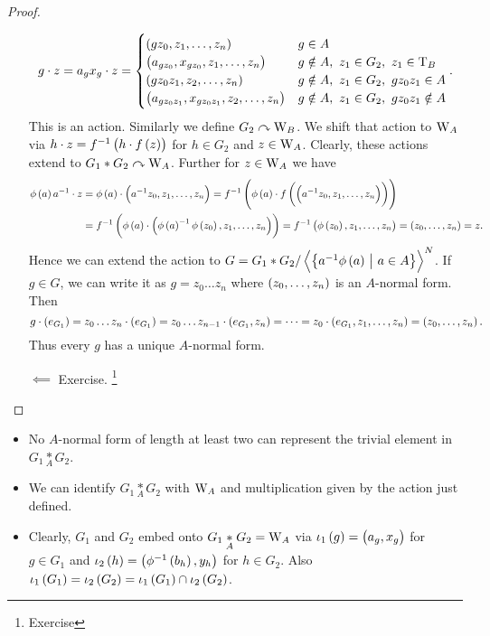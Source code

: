 \begin{proof}
\begin{itemize}
$$ g \cdot z = a_gx_g \cdot z =
\begin{cases}
\br{gz_0, z_1, \dots, z_n} & g \in A \\
\br{a_{gz_0}, x_{gz_0}, z_1, \dots, z_n} & g \notin A, \ z_1 \in G_2, \ z_1 \in \T_B \\
\br{gz_0z_1, z_2, \dots, z_n} & g \notin A, \ z_1 \in G_2, \ gz_0z_1 \in A \\
\br{a_{gz_0z_1}, x_{gz_0z_1}, z_2, \dots, z_n} & g \notin A, \ z_1 \in G_2, \ gz_0z_1 \notin A
\end{cases}.
$$
This is an action. Similarly we define $ G_2 \curvearrowright \mathrm{W}_B $. We shift that action to $ \mathrm{W}_A $ via $ h \cdot z = f^{-1}\br{h \cdot f\br{z}} $ for $ h \in G_2 $ and $ z \in \mathrm{W}_A $. Clearly, these actions extend to $ G_1 * G_2 \curvearrowright \mathrm{W}_A $. Further for $ z \in \mathrm{W}_A $ we have
\begin{align*}
\phi\br{a}a^{-1} \cdot z
& = \phi\br{a} \cdot \br{a^{-1}z_0, z_1, \dots, z_n}
= f^{-1}\br{\phi\br{a} \cdot f\br{\br{a^{-1}z_0, z_1, \dots, z_n}}} \\
& = f^{-1}\br{\phi\br{a} \cdot \br{\phi\br{a}^{-1}\phi\br{z_0}, z_1, \dots, z_n}}
= f^{-1}\br{\phi\br{z_0}, z_1, \dots, z_n}
= \br{z_0, \dots, z_n}
= z.
\end{align*}
Hence we can extend the action to $ G = G_1 * G_2 / \abr{\cbr{a^{-1}\phi\br{a} \st a \in A}}^N $. If $ g \in G $, we can write it as $ g = z_0 \dots z_n $ where $ \br{z_0, \dots, z_n} $ is an $ A $-normal form. Then
$$ g \cdot \br{e_{G_1}} = z_0 \dots z_n \cdot \br{e_{G_1}} = z_0 \dots z_{n - 1} \cdot \br{e_{G_1}, z_n} = \dots = z_0 \cdot \br{e_{G_1}, z_1, \dots, z_n} = \br{z_0, \dots, z_n}. $$
Thus every $ g $ has a unique $ A $-normal form.
\item[$ \impliedby $] Exercise. \footnote{Exercise}
\end{itemize}
\end{proof}


\begin{corollary}
\hfill
\begin{itemize}
\item No $ A $-normal form of length at least two can represent the trivial element in $ G_1 \underset{A}{*} G_2 $.
\item We can identify $ G_1 \underset{A}{*} G_2 $ with $ \mathrm{W}_A $ and multiplication given by the action just defined.
\item Clearly, $ G_1 $ and $ G_2 $ embed onto $ G_1 \underset{A}{*} G_2 = \mathrm{W}_A $ via $ \iota_1\br{g} = \br{a_g, x_g} $ for $ g \in G_1 $ and $ \iota_2\br{h} = \br{\phi^{-1}\br{b_h}, y_h} $ for $ h \in G_2 $. Also $ \iota_1\br{G_1} = \iota_2\br{G_2} = \iota_1\br{G_1} \cap \iota_2\br{G_2} $.
\end{itemize}
\end{corollary}

